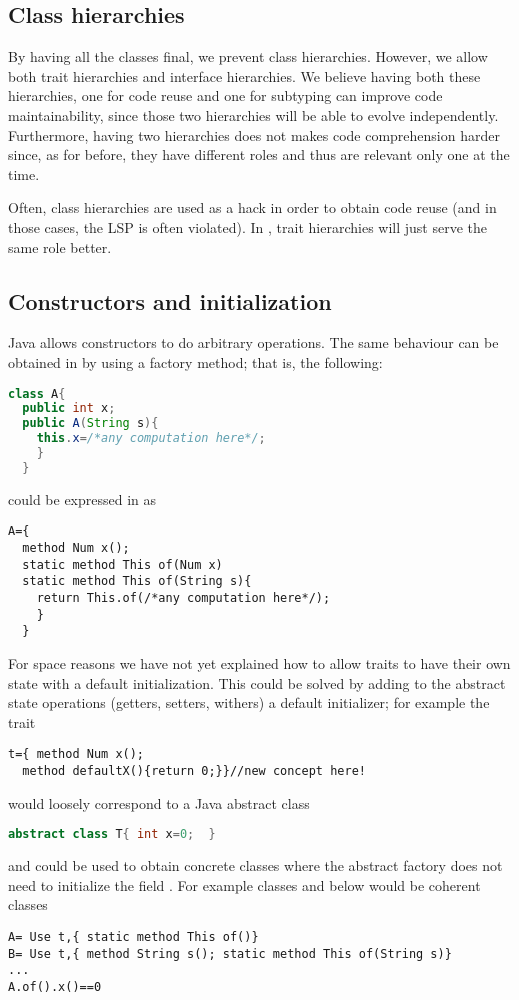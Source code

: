 \subsection{Class hierarchies}
By having all the classes final, we prevent class hierarchies.
However,
we allow both trait hierarchies and interface hierarchies.
We believe having both these hierarchies,
one for code reuse and one for subtyping can improve code
maintainability, since those two hierarchies will be able to evolve independently. Furthermore, having two hierarchies does not makes code comprehension harder since, as for before, they have different roles and thus are relevant only one at the time.

Often, class hierarchies are used as a hack in order to obtain code reuse (and in those cases, the LSP is often violated).
In \name, trait hierarchies will just serve the same role better.


\subsection{Constructors and initialization}
Java allows constructors to do arbitrary operations.
The same behaviour can be obtained in \name by using a factory method; that is, the following:
\begin{lstlisting}[language=Java]
class A{
  public int x;
  public A(String s){
    this.x=/*any computation here*/;
    }
  }
\end{lstlisting}
could be expressed in \name as 
\begin{lstlisting}
A={
  method Num x();
  static method This of(Num x)
  static method This of(String s){
    return This.of(/*any computation here*/);
    }
  }
\end{lstlisting}

For space reasons we have not yet explained how to allow traits to have their own state with a default initialization.
This could be solved by adding to the abstract state operations (getters, setters, withers) a default initializer;
for example the trait
\begin{lstlisting}
t={ method Num x();
  method defaultX(){return 0;}}//new concept here!
\end{lstlisting}
would loosely correspond to a Java abstract class
\begin{lstlisting}[language=Java]
abstract class T{ int x=0;  }
\end{lstlisting}
and could be used to obtain concrete classes where the abstract factory does not need to initialize the field \Q@x@.
For example classes \Q@A@ and \Q@B@ below would be coherent classes
\begin{lstlisting}
A= Use t,{ static method This of()}
B= Use t,{ method String s(); static method This of(String s)}
...
A.of().x()==0
\end{lstlisting}

